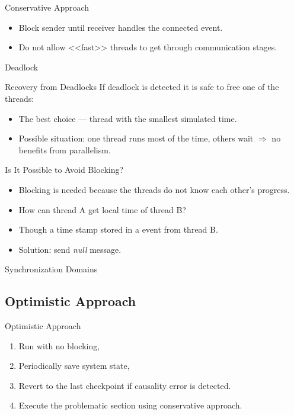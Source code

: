 \begin{frame}{Conservative Approach}
  \begin{itemize}
    \item Block sender until receiver handles the connected event.
    \item Do not allow <<fast>> threads to get through communication stages.
  \end{itemize}
  \centering
\end{frame}

\begin{frame}{Deadlock}
  \centering
\end{frame}

\begin{frame}{Recovery from Deadlocks}
  If deadlock is detected it is safe to free one of the threads:
  \begin{itemize}
    \item The best choice --- thread with the smallest simulated time.
    \item Possible situation: one thread runs most of the time, others wait
      $\Rightarrow$ no benefits from parallelism.
  \end{itemize}
\end{frame}

\begin{frame}{Is It Possible to Avoid Blocking?}
  \begin{itemize}
    \item Blocking is needed because the threads do not know each other's
      progress.
    \item How can thread A get local time of thread B? \pause
    \item Though a time stamp stored in a event from thread B.
    \item Solution: send \textit{null} message.
  \end{itemize}
\end{frame}

\begin{frame}{Synchronization Domains}
  \centering
\end{frame}

\subsection{Optimistic Approach}

\begin{frame}{Optimistic Approach}
  \begin{enumerate}
    \item Run with no blocking,
    \item Periodically save system state,
    \item Revert to the last checkpoint if causality error is detected.
    \item Execute the problematic section using conservative approach.
  \end{enumerate}
\end{frame}

